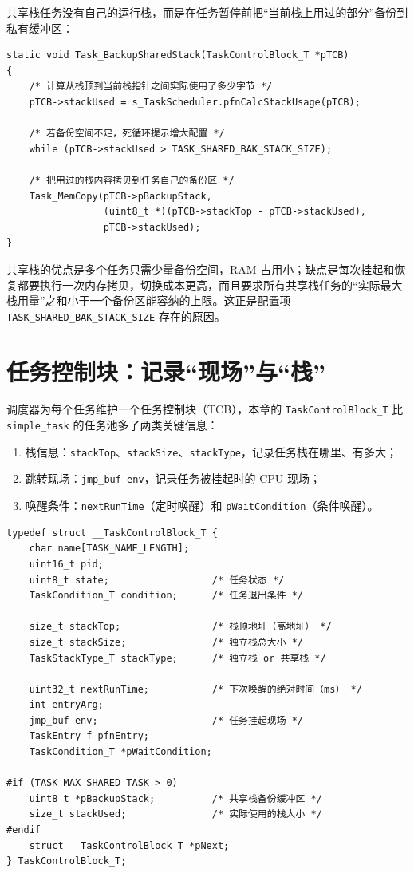 共享栈任务没有自己的运行栈，而是在任务暂停前把“当前栈上用过的部分”备份到私有缓冲区：

\begin{lstlisting}[style=c]
static void Task_BackupSharedStack(TaskControlBlock_T *pTCB)
{
    /* 计算从栈顶到当前栈指针之间实际使用了多少字节 */
    pTCB->stackUsed = s_TaskScheduler.pfnCalcStackUsage(pTCB);

    /* 若备份空间不足，死循环提示增大配置 */
    while (pTCB->stackUsed > TASK_SHARED_BAK_STACK_SIZE);

    /* 把用过的栈内容拷贝到任务自己的备份区 */
    Task_MemCopy(pTCB->pBackupStack,
                 (uint8_t *)(pTCB->stackTop - pTCB->stackUsed),
                 pTCB->stackUsed);
}
\end{lstlisting}

共享栈的优点是多个任务只需少量备份空间，RAM 占用小；缺点是每次挂起和恢复都要执行一次内存拷贝，切换成本更高，而且要求所有共享栈任务的“实际最大栈用量”之和小于一个备份区能容纳的上限。这正是配置项 \texttt{TASK\_SHARED\_BAK\_STACK\_SIZE} 存在的原因。

\section{任务控制块：记录“现场”与“栈”}

调度器为每个任务维护一个任务控制块（TCB），本章的 \texttt{TaskControlBlock\_T} 比 \texttt{simple\_task} 的任务池多了两类关键信息：

\begin{enumerate}
\item 栈信息：\texttt{stackTop}、\texttt{stackSize}、\texttt{stackType}，记录任务栈在哪里、有多大；
\item 跳转现场：\texttt{jmp\_buf env}，记录任务被挂起时的 CPU 现场；
\item 唤醒条件：\texttt{nextRunTime}（定时唤醒）和 \texttt{pWaitCondition}（条件唤醒）。
\end{enumerate}

\begin{lstlisting}[style=c]
typedef struct __TaskControlBlock_T {
    char name[TASK_NAME_LENGTH];
    uint16_t pid;
    uint8_t state;                  /* 任务状态 */
    TaskCondition_T condition;      /* 任务退出条件 */

    size_t stackTop;                /* 栈顶地址（高地址） */
    size_t stackSize;               /* 独立栈总大小 */
    TaskStackType_T stackType;      /* 独立栈 or 共享栈 */

    uint32_t nextRunTime;           /* 下次唤醒的绝对时间（ms） */
    int entryArg;
    jmp_buf env;                    /* 任务挂起现场 */
    TaskEntry_f pfnEntry;
    TaskCondition_T *pWaitCondition;

#if (TASK_MAX_SHARED_TASK > 0)
    uint8_t *pBackupStack;          /* 共享栈备份缓冲区 */
    size_t stackUsed;               /* 实际使用的栈大小 */
#endif
    struct __TaskControlBlock_T *pNext;
} TaskControlBlock_T;
\end{lstlisting}

